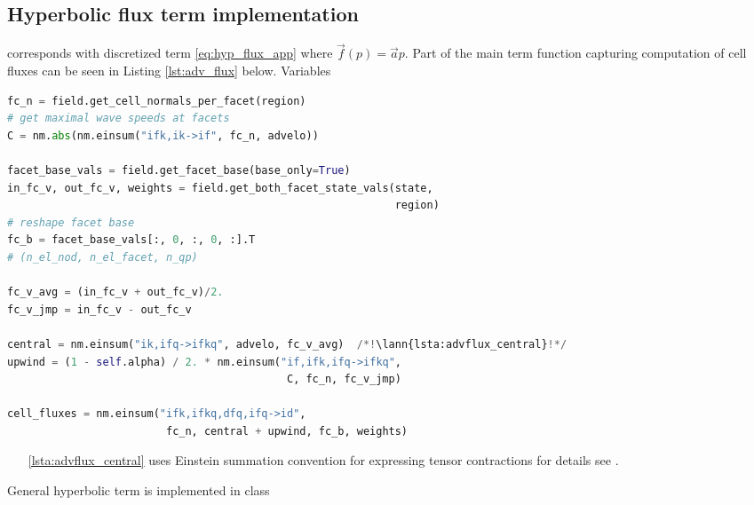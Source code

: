 \subsection{Hyperbolic flux term implementation}
\label{se:adv_flux_term_imp}
 corresponds with discretized term \eqref{eq:hyp_flux_app} 
where $\vec{f}(p) = \vec{a}p$. Part of the main term function capturing computation of 
cell fluxes can be seen in Listing \ref{lst:adv_flux} below. Variables 
\setcounter{lstannotation}{0}
\begin{lstlisting}[language=Python, caption=Computation of advection cell 
fluxes \label{lst:adv_flux}]
fc_n = field.get_cell_normals_per_facet(region)
# get maximal wave speeds at facets
C = nm.abs(nm.einsum("ifk,ik->if", fc_n, advelo))

facet_base_vals = field.get_facet_base(base_only=True)
in_fc_v, out_fc_v, weights = field.get_both_facet_state_vals(state,
                                                             region)
# reshape facet base
fc_b = facet_base_vals[:, 0, :, 0, :].T
# (n_el_nod, n_el_facet, n_qp)

fc_v_avg = (in_fc_v + out_fc_v)/2.
fc_v_jmp = in_fc_v - out_fc_v

central = nm.einsum("ik,ifq->ifkq", advelo, fc_v_avg)  /*!\lann{lsta:advflux_central}!*/
upwind = (1 - self.alpha) / 2. * nm.einsum("if,ifk,ifq->ifkq",
                                            C, fc_n, fc_v_jmp)

cell_fluxes = nm.einsum("ifk,ifkq,dfq,ifq->id",
                         fc_n, central + upwind, fc_b, weights)
\end{lstlisting}
\begin{itemize}
	\item[\ref{lsta:advflux_central}]  uses Einstein 
	summation convention for expressing tensor contractions for details see 
	\cite{einsum-doc}.
\end{itemize}



General hyperbolic term is implemented in class 



